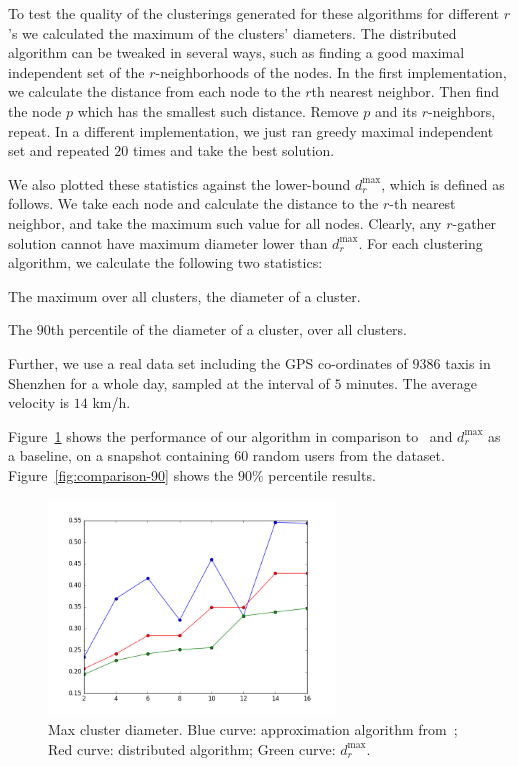 

To test the quality of the clusterings generated for these algorithms for different $r$'s we calculated the maximum of the clusters' diameters. The distributed algorithm can be tweaked in several ways, such as finding a good maximal independent set of the $r$-neighborhoods of the nodes. In the first implementation, we calculate the distance from each node to the $r$th nearest neighbor. Then find the node $p$ which has the smallest such distance. Remove $p$ and its $r$-neighbors, repeat. In a different implementation, we just ran greedy maximal independent set and repeated $20$ times and take the best solution. 

We also plotted these statistics against the lower-bound $d_r^{\max}$, which is defined as follows. We take each node and calculate the distance to the $r$-th nearest neighbor, and take the maximum such value for all nodes. Clearly, any $r$-gather solution cannot have maximum diameter lower than $d_r^{\max}$.
For each clustering algorithm, we calculate the following two statistics:
\bitem
\item  The maximum over all clusters, the diameter of a cluster.  
\item  The $90$th percentile of the diameter of a cluster, over all clusters.
\eitem

Further, we use a real data set including the GPS co-ordinates of $9386$ taxis in Shenzhen for a whole day, sampled at the interval of $5$ minutes. The average velocity is $14$ km/h.

Figure~\ref{fig:comparison} shows the performance of our algorithm in comparison
to~\cite{Aggarwal06achievinganonymity} and $d_{r}^{\max}$ as a baseline, on a snapshot containing $60$ random users from the dataset. Figure~\ref{fig:comparison-90} shows the $90\%$ percentile results.  

\begin{figure}[h]
\begin{center}
\includegraphics[width=3in]{figs/figure_1.png}
\caption{Max cluster diameter. Blue curve: approximation algorithm from~\cite{Aggarwal06achievinganonymity}; Red curve: distributed algorithm; Green curve: $d_{r}^{\max}$.}\label{fig:comparison}
\end{center}
\end{figure}



